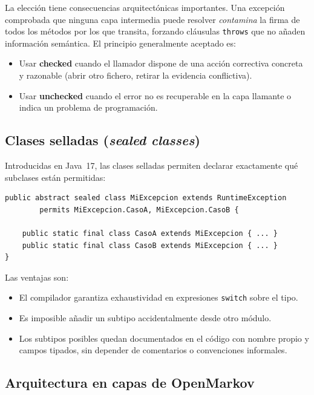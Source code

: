 \documentclass[12pt,a4paper]{article}
\begin{document}
La elección tiene consecuencias arquitectónicas importantes. Una excepción
comprobada que ninguna capa intermedia puede resolver \emph{contamina} la firma
de todos los métodos por los que transita, forzando cláusulas \texttt{throws} que
no añaden información semántica. El principio generalmente aceptado es:

\begin{itemize}
  \item Usar \textbf{checked} cuando el llamador dispone de una acción correctiva
    concreta y razonable (abrir otro fichero, retirar la evidencia conflictiva).
  \item Usar \textbf{unchecked} cuando el error no es recuperable en la capa
    llamante o indica un problema de programación.
\end{itemize}

\subsection{Clases selladas (\textit{sealed classes})}
\label{sec:sealed}

Introducidas en Java~17, las clases selladas permiten declarar exactamente qué
subclases están permitidas:

\begin{lstlisting}[caption={Sintaxis de clase sellada}]
public abstract sealed class MiExcepcion extends RuntimeException
        permits MiExcepcion.CasoA, MiExcepcion.CasoB {

    public static final class CasoA extends MiExcepcion { ... }
    public static final class CasoB extends MiExcepcion { ... }
}
\end{lstlisting}

Las ventajas son:
\begin{itemize}
  \item El compilador garantiza exhaustividad en expresiones \texttt{switch}
    sobre el tipo.
  \item Es imposible añadir un subtipo accidentalmente desde otro módulo.
  \item Los subtipos posibles quedan documentados en el código con nombre propio
    y campos tipados, sin depender de comentarios o convenciones informales.
\end{itemize}

\subsection{Arquitectura en capas de OpenMarkov}
\label{sec:capas}
\end{document}
